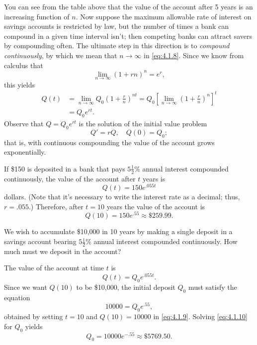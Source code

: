 \documentclass{ximera}
\begin{document}
You can see from the table above that the value of the account after 5 years is an increasing function of $n$. Now suppose the maximum
allowable rate of interest on savings accounts is restricted by law,
but the number of times a bank can compound in a given time interval isn't;  %
then competing banks can attract savers by compounding often. The ultimate step in this direction is to \textit{compound continuously}, by which we mean that $n\rightarrow\infty$ in \eqref{eq:4.1.8}. Since we know from calculus
that
$$
\lim_{n\rightarrow\infty} \left(1+{r}{n}\right)^n=e^r,
$$
 this yields
$$\begin{array}{rl}
Q(t) & =\lim_{n\rightarrow\infty} Q_0\left(1+\frac{r}{n}\right)^{nt}=Q_0 \left[
\lim_{n\rightarrow\infty} \left(1+\frac{r}{n}\right)^n\right]^t \\
&=Q_0e^{rt}.
\end{array}$$
Observe that $Q=Q_0e^{rt}$ is the solution of the initial value problem
$$
Q'=rQ, \quad Q(0)=Q_0;
$$
 that is, with continuous compounding the value of the account
grows exponentially.

\begin{example}\label{example:4.1.2}
If \$150 is deposited in a bank that pays
$5\frac{1}{2}$\% annual
interest compounded continuously,  the value of the account after
$t$ years is
$$
Q(t)=150e^{.055t}
$$
dollars. (Note that it's necessary to write the interest rate as a
decimal;   thus, $r=.055$.) Therefore, after $t=10$ years the value
of the account is
$$
Q(10)=150e^{.55} \approx \$259.99.
$$
\end{example}

\begin{example}\label{example:4.1.3}
We wish to accumulate \$10,000 in 10 years by making a single deposit
in a savings account bearing $5\frac{1}{2}$\% annual interest
compounded continuously. How much must we deposit in the account?


\begin{explanation}  
The value of the account at time $t$ is
\begin{equation} \label{eq:4.1.9}
Q(t)=Q_0e^{.055t}.
\end{equation}
Since we want $Q(10)$ to be \$10,000, the initial deposit $Q_0$ must
satisfy the equation
\begin{equation} \label{eq:4.1.10}
10000=Q_0e^{.55},
\end{equation}
 obtained by setting $t=10$ and $Q(10)=10000$ in
\eqref{eq:4.1.9}.  Solving \eqref{eq:4.1.10} for $Q_0$ yields
$$
Q_0=10000e^{-.55} \approx \$5769.50.
$$
\end{explanation}
\end{example}
\end{document}
